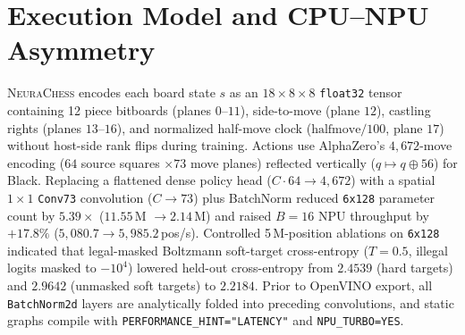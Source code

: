 \documentclass[10pt,twocolumn]{article}
\begin{document}
\section{Execution Model and CPU--NPU Asymmetry}
\label{sec:formulation}

\textsc{NeuraChess} encodes each board state $s$ as an $18 \times 8 \times 8$ \texttt{float32} tensor containing 12 piece bitboards (planes $0\text{--}11$), side-to-move (plane $12$), castling rights (planes $13\text{--}16$), and normalized half-move clock ($\text{halfmove}/100$, plane $17$) without host-side rank flips during training. Actions use AlphaZero's $4{,}672$-move encoding ($64$ source squares $\times 73$ move planes) reflected vertically ($q \mapsto q \oplus 56$) for Black. Replacing a flattened dense policy head ($C\cdot 64 \to 4{,}672$) with a spatial $1\times 1$ \texttt{Conv73} convolution ($C \to 73$) plus BatchNorm reduced \texttt{6x128} parameter count by $5.39\times$ ($11.55$\,M $\to 2.14$\,M) and raised $B=16$ NPU throughput by $+17.8\%$ ($5{,}080.7 \to 5{,}985.2$\,pos/s). Controlled 5\,M-position ablations on \texttt{6x128} indicated that legal-masked Boltzmann soft-target cross-entropy ($T=0.5$, illegal logits masked to $-10^4$) lowered held-out cross-entropy from $2.4539$ (hard targets) and $2.9642$ (unmasked soft targets) to $2.2184$. Prior to OpenVINO export, all \texttt{BatchNorm2d} layers are analytically folded into preceding convolutions, and static graphs compile with \texttt{PERFORMANCE\_HINT="LATENCY"} and \texttt{NPU\_TURBO=YES}.

\begin{table}[t]
  \centering
  \caption{\textbf{Backbone Microbenchmark on Intel NPU 3720 ($B=16$, FP16).} Scaled dot-product attention transformers incur hardware stalls relative to SE-ResNets at comparable parameter counts.}
  \label{tab:cnn_vs_tf}
\end{table}
\end{document}

